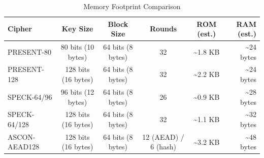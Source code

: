 \begin{table}
\caption{Memory Footprint Comparison}
\label{tab:memory}
\begin{tabular}{@{}lccccr@{}}
\toprule
Cipher & Key Size & Block Size & Rounds & ROM (est.) & RAM (est.) \\
\midrule
PRESENT-80 & 80 bits (10 bytes) & 64 bits (8 bytes) & 32 & \textasciitilde 1.8 KB & \textasciitilde 24 bytes \\
PRESENT-128 & 128 bits (16 bytes) & 64 bits (8 bytes) & 32 & \textasciitilde 2.2 KB & \textasciitilde 24 bytes \\
SPECK-64/96 & 96 bits (12 bytes) & 64 bits (8 bytes) & 26 & \textasciitilde 0.9 KB & \textasciitilde 28 bytes \\
SPECK-64/128 & 128 bits (16 bytes) & 64 bits (8 bytes) & 32 & \textasciitilde 1.1 KB & \textasciitilde 32 bytes \\
ASCON-AEAD128 & 128 bits (16 bytes) & 64 bits (8 bytes) & 12 (AEAD) / 6 (hash) & \textasciitilde 3.2 KB & \textasciitilde 48 bytes \\
\bottomrule
\end{tabular}
\end{table}
